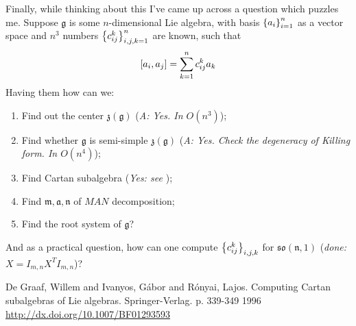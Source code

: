 \documentclass[12pt]{article} %
\begin{document}
Finally, while thinking about this I've came up across a question which puzzles me. Suppose $\mathfrak{g}$ is some $n$-dimensional Lie algebra,
with basis $\left\{a_i\right\}_{i=1}^n$ as a vector space and $n^3$ numbers $\left\{c_{ij}^k\right\}_{i,j,k=1}^n$ are known, such that
\[\mysbra{a_i,a_j}=\sum_{k=1}^nc_{ij}^ka_k\]
Having them how can we:
\begin{enumerate}
\item Find out the center $\mathfrak{z(g)}$ (\textit{A: Yes. In $O(n^3)$});
\item Find whether $\mathfrak{g}$ is semi-simple $\mathfrak{z(g)}$ (\textit{A: Yes. Check the degeneracy of Killing form. In $O(n^4)$});
\item Find Cartan subalgebra (\textit{Yes: see \cite{graaf}});
\item Find $\mathfrak{m},\mathfrak{a},\mathfrak{n}$ of $MAN$ decomposition;
\item Find the root system of $\mathfrak{g}$?
\end{enumerate}
And as a practical question, how can one compute $\left\{c_{ij}^k\right\}_{i,j,k}$ for $\mathfrak{so(n,1)}$ (\textit{done: $X=I_{m,n}X^TI_{m,n}$})?
\begin{thebibliography}{9}
De Graaf, Willem and Ivanyos, Gábor and Rónyai, Lajos. Computing Cartan subalgebras of Lie algebras. Springer-Verlag. p. 339-349 1996
\url{ http://dx.doi.org/10.1007/BF01293593}
\end{thebibliography}
\end{document}
